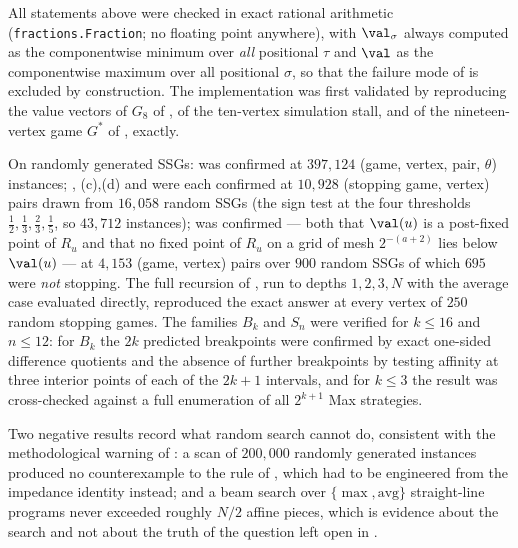 \begin{remark}[Verification]\label{rem:bv-verify}
All statements above were checked in exact rational arithmetic
(\texttt{fractions.Fraction}; no floating point anywhere), with
$\val_\sigma$ always computed as the componentwise minimum over
\emph{all} positional $\tau$ and $\val$ as the componentwise maximum over
all positional $\sigma$, so that the failure mode of  is
excluded by construction. The implementation was first validated by
reproducing the value vectors of $G_8$ of ,
of the ten-vertex simulation stall, and of the nineteen-vertex game
$G^{\ast}$ of , exactly.

On randomly generated SSGs:  was confirmed at
$397{,}124$ (game, vertex, pair, $\theta$) instances;
, (c),(d) and
 were each confirmed at $10{,}928$
(stopping game, vertex) pairs drawn from $16{,}058$ random SSGs (the sign
test at the four thresholds $\tfrac12,\tfrac13,\tfrac23,\tfrac15$, so
$43{,}712$ instances);
 was confirmed --- both that $\val(u)$ is a post-fixed
point of $R_u$ and that no fixed point of $R_u$ on a grid of mesh
$2^{-(a+2)}$ lies below $\val(u)$ --- at $4{,}153$ (game, vertex) pairs
over $900$ random SSGs of which $695$ were \emph{not} stopping. The full
recursion of , run to depths $1,2,3,N$ with the
average case evaluated directly, reproduced the exact answer at every
vertex of $250$ random stopping games. The families $B_k$ and $S_n$ were
verified for $k\le16$ and $n\le12$: for $B_k$ the $2k$ predicted
breakpoints were confirmed by exact one-sided difference quotients and
the absence of further breakpoints by testing affinity at three interior
points of each of the $2k+1$ intervals, and for $k\le3$ the result was
cross-checked against a full enumeration of all $2^{k+1}$ Max strategies.

Two negative results record what random search cannot do, consistent with
the methodological warning of : a scan of $200{,}000$ randomly
generated instances produced no counterexample to the rule of
, which had to be engineered from the impedance
identity instead; and a beam search over $\{\max,\mathrm{avg}\}$ straight-line
programs never exceeded roughly $N/2$ affine pieces, which is evidence
about the search and not about the truth of the question left open in
.
\end{remark}
